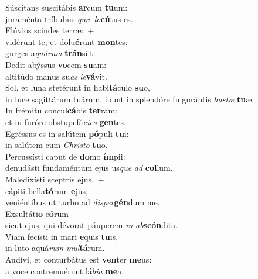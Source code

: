 \evenverse Súscitans suscitábis \textbf{ar}cum \textbf{tu}um:~\*\\
\evenverse juraménta tríbubus \textit{quæ} \textit{lo}\textbf{cú}tus es.\\
\oddverse Flúvios scindes terræ:~+\\
\oddverse  vidérunt te, et dolu\textbf{é}runt \textbf{mon}tes:~\*\\
\oddverse gurges a\textit{quá}\textit{rum} \textbf{trán}siit.\\
\evenverse Dedit abýssus \textbf{vo}cem \textbf{su}am:~\*\\
\evenverse altitúdo manus su\textit{as} \textit{le}\textbf{vá}vit.\\
\oddverse Sol, et luna stetérunt in habi\textbf{tá}culo \textbf{su}o,~\*\\
\oddverse in luce sagittárum tuárum, ibunt in splendóre fulgurántis \textit{ha}\textit{stæ} \textbf{tu}æ.\\
\evenverse In frémitu concul\textbf{cá}bis \textbf{ter}ram:~\*\\
\evenverse et in furóre obstupefá\textit{ci}\textit{es} \textbf{gen}tes.\\
\oddverse Egréssus es in salútem \textbf{pó}puli \textbf{tu}i:~\*\\
\oddverse in salútem cum \textit{Chri}\textit{sto} \textbf{tu}o.\\
\evenverse Percussísti caput de \textbf{do}mo \textbf{ím}pii:~\*\\
\evenverse denudásti fundaméntum ejus us\textit{que} \textit{ad} \textbf{col}lum.\\
\oddverse Maledixísti sceptris ejus,~+\\
\oddverse  cápiti bella\textbf{tó}rum \textbf{e}jus,~\*\\
\oddverse veniéntibus ut turbo ad \textit{di}\textit{sper}\textbf{gén}dum me.\\
\evenverse Exsultáti\textbf{o} e\textbf{ó}rum~\*\\
\evenverse sicut ejus, qui dévorat páuperem \textit{in} \textit{ab}\textbf{scón}dito.\\
\oddverse Viam fecísti in mari \textbf{e}quis \textbf{tu}is,~\*\\
\oddverse in luto aquá\textit{rum} \textit{mul}\textbf{tá}rum.\\
\evenverse Audívi, et conturbátus est \textbf{ven}ter \textbf{me}us:~\*\\
\evenverse a voce contremuérunt lá\textit{bi}\textit{a} \textbf{me}a.\\
